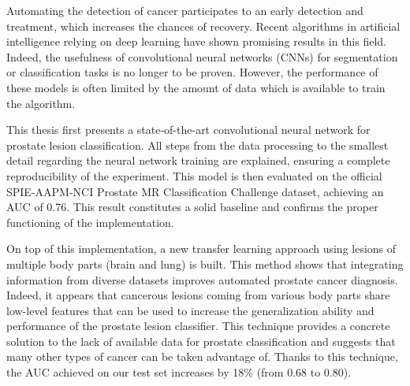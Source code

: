 Automating the detection of cancer participates to an early detection and treatment, which increases the chances of recovery. Recent algorithms in artificial intelligence relying on deep learning have shown promising results in this field. Indeed, the usefulness of convolutional neural networks (CNNs) for segmentation or classification tasks is no longer to be proven. However, the performance of these models is often limited by the amount of data which is available to train the algorithm.

This thesis first presents a state-of-the-art convolutional neural network for pro\-state lesion classification. All steps from the data processing to the smallest detail regarding the neural network training are explained, ensuring a complete reproducibility of the experiment. This model is then evaluated on the official SPIE-AAPM-NCI Prostate MR Classification Challenge dataset, achieving an AUC of 0.76. This result constitutes a solid baseline and confirms the proper functioning of the implementation.

On top of this implementation, a new transfer learning approach using lesions of multiple body parts (brain and lung) is built. This method shows that integrating information from diverse datasets improves automated prostate cancer diagnosis. Indeed, it appears that cancerous lesions coming from various body parts share low-level features that can be used to increase the generalization ability and performance of the prostate lesion classifier. This technique provides a concrete solution to the lack of available data for prostate classification and suggests that many other types of cancer can be taken advantage of. Thanks to this technique, the AUC achieved on our test set increases by 18\% (from 0.68 to 0.80). 
